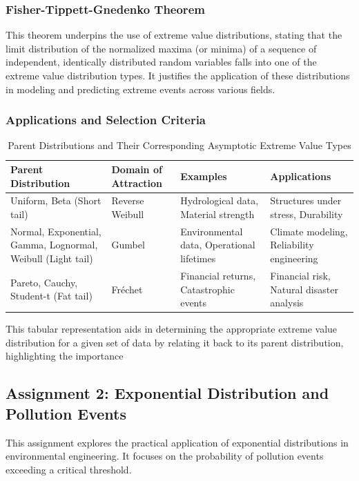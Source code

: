 \subsubsection*{Fisher-Tippett-Gnedenko Theorem}
This theorem underpins the use of extreme value distributions, stating that the limit distribution of the normalized maxima (or minima) of a sequence of independent, identically distributed random variables falls into one of the extreme value distribution types. It justifies the application of these distributions in modeling and predicting extreme events across various fields.


\subsubsection*{Applications and Selection Criteria}

\begin{table}[ht]
\centering
\caption{Parent Distributions and Their Corresponding Asymptotic Extreme Value Types}
\begin{tabular}{|p{3cm}|p{4cm}|p{3cm}|p{3cm}|}
\hline
\textbf{Parent Distribution} & \textbf{Domain of Attraction} & \textbf{Examples} & \textbf{Applications} \\
\hline
Uniform, Beta (Short tail) & Reverse Weibull & Hydrological data, Material strength & Structures under stress, Durability \\
\hline
Normal, Exponential, Gamma, Lognormal, Weibull (Light tail) & Gumbel & Environmental data, Operational lifetimes & Climate modeling, Reliability engineering \\
\hline
Pareto, Cauchy, Student-t (Fat tail) & Fréchet & Financial returns, Catastrophic events & Financial risk, Natural disaster analysis \\
\hline
\end{tabular}
\label{table:GEV_domain_of_attraction}
\end{table}

This tabular representation aids in determining the appropriate extreme value distribution for a given set of data by relating it back to its parent distribution, highlighting the importance

\subsection*{Assignment 2: Exponential Distribution and Pollution Events}
This assignment explores the practical application of exponential distributions in environmental engineering. It focuses on the probability of pollution events exceeding a critical threshold.

